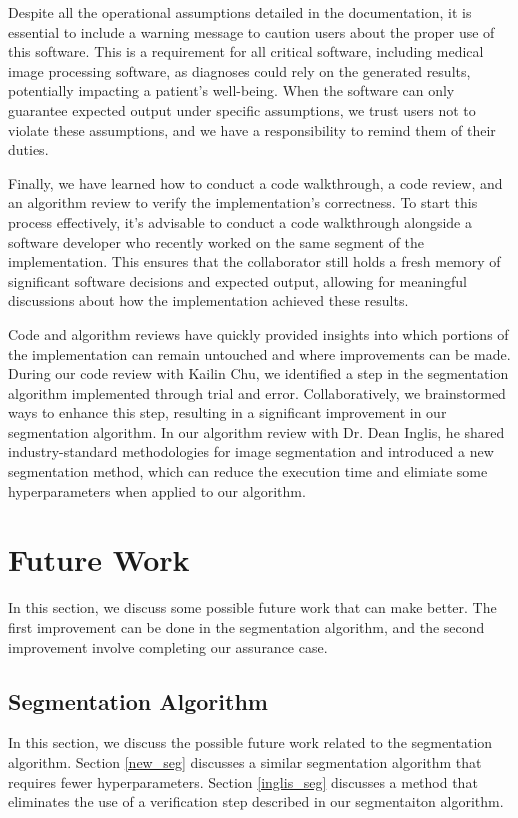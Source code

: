 Despite all the operational assumptions detailed in the documentation, it is essential to include a warning message to caution users about the proper use of this software. This is a requirement for all critical software, including medical image processing software, as diagnoses could rely on the generated results, potentially impacting a patient's well-being. When the software can only guarantee expected output under specific assumptions, we trust users not to violate these assumptions, and we have a responsibility to remind them of their duties.

Finally, we have learned how to conduct a code walkthrough, a code review, and an algorithm review to verify the implementation's correctness. To start this process effectively, it's advisable to conduct a code walkthrough alongside a software developer who recently worked on the same segment of the implementation. This ensures that the collaborator still holds a fresh memory of significant software decisions and expected output, allowing for meaningful discussions about how the implementation achieved these results.

Code and algorithm reviews have quickly provided insights into which portions of the implementation can remain untouched and where improvements can be made. During our code review with Kailin Chu, we identified a step in the segmentation algorithm implemented through trial and error. Collaboratively, we brainstormed ways to enhance this step, resulting in a significant improvement in our segmentation algorithm. In our algorithm review with Dr. Dean Inglis, he shared industry-standard methodologies for image segmentation and introduced a new segmentation method, which can reduce the execution time and elimiate some hyperparameters when applied to our algorithm.


\section{Future Work}\label{fw}

In this section, we discuss some possible future work that can make \progname{} better. The first improvement can be done in the segmentation algorithm, and the second improvement involve completing our assurance case.

\subsection{Segmentation Algorithm}

In this section, we discuss the possible future work related to the segmentation algorithm. Section \ref{new_seg} discusses a similar segmentation algorithm that requires fewer hyperparameters. Section \ref{inglis_seg} discusses a method that eliminates the use of a verification step described in our segmentaiton algorithm.

